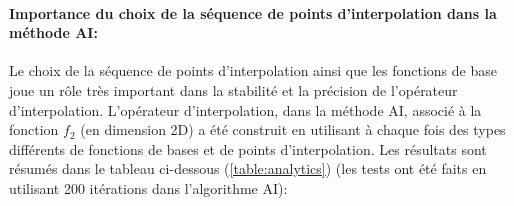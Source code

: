 \paragraph{Importance du choix de la séquence de points d'interpolation dans la méthode AI:\\}
\hspace{0.5cm} Le choix de la séquence de points d'interpolation ainsi que les fonctions de base joue un rôle très important dans la stabilité et la précision de l'opérateur d'interpolation. L'opérateur d'interpolation, dans la méthode AI, associé à la fonction $f_2$ (en dimension 2D) a été construit en utilisant à chaque fois des types différents de fonctions de bases et de points d'interpolation. Les résultats sont résumés dans le tableau ci-dessous (\ref{table:analytics}) (les tests ont été faits en utilisant 200 itérations dans l'algorithme AI):

